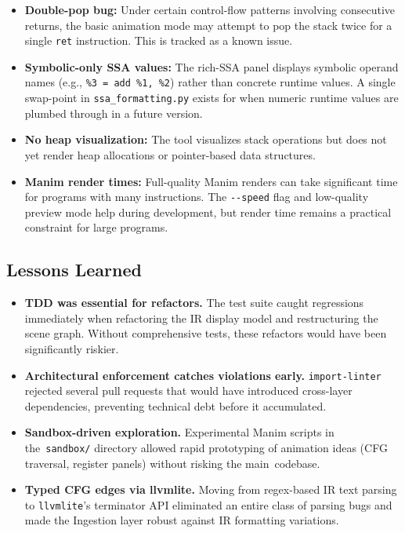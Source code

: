 \begin{itemize}
    \item \textbf{Double-pop bug:} Under certain control-flow patterns involving consecutive returns, the basic animation mode may attempt to pop the stack twice for a single \texttt{ret} instruction. This is tracked as a known issue.

    \item \textbf{Symbolic-only SSA values:} The rich-SSA panel displays symbolic operand names (e.g., \texttt{\%3 = add \%1, \%2}) rather than concrete runtime values. A single swap-point in \texttt{ssa\_formatting.py} exists for when numeric runtime values are plumbed through in a future version.

    \item \textbf{No heap visualization:} The tool visualizes stack operations but does not yet render heap allocations or pointer-based data structures.

    \item \textbf{Manim render times:} Full-quality Manim renders can take significant time for programs with many instructions. The \texttt{-{}-speed} flag and low-quality preview mode help during development, but render time remains a practical constraint for large programs.
\end{itemize}

\subsection{Lessons Learned}
\begin{itemize}
    \item \textbf{TDD was essential for refactors.} The test suite caught regressions immediately when refactoring the IR display model and restructuring the scene graph. Without comprehensive tests, these refactors would have been significantly riskier.

    \item \textbf{Architectural enforcement catches violations early.} \texttt{import-linter} rejected several pull requests that would have introduced cross-layer dependencies, preventing technical debt before it accumulated.

    \item \textbf{Sandbox-driven exploration.} Experimental Manim scripts in the~\texttt{sandbox/} directory allowed rapid prototyping of animation ideas (CFG traversal, register panels) without risking the main~codebase.

    \item \textbf{Typed CFG edges via llvmlite.} Moving from regex-based IR text parsing to \texttt{llvmlite}'s terminator API eliminated an entire class of parsing bugs and made the Ingestion layer robust against IR formatting variations.
\end{itemize}
